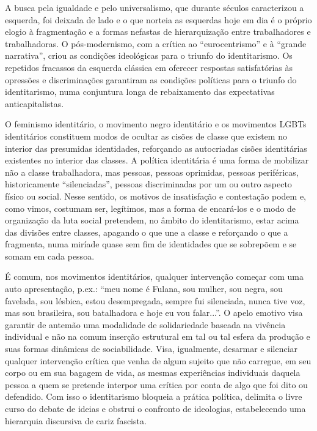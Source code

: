 A busca pela igualdade e pelo universalismo, que durante séculos
caracterizou a esquerda, foi deixada de lado e o que norteia as
esquerdas hoje em dia é o próprio elogio à fragmentação e a formas
nefastas de hierarquização entre trabalhadores e trabalhadoras. O
pós-modernismo, com a crítica ao ``eurocentrismo'' e à ``grande
narrativa'', criou as condições ideológicas para o triunfo do
identitarismo. Os repetidos fracassos da esquerda clássica em oferecer
respostas satisfatórias às opressões e discriminações garantiram as
condições políticas para o triunfo do identitarismo, numa conjuntura
longa de rebaixamento das expectativas anticapitalistas.

O feminismo identitário, o movimento negro identitário e os movimentos
LGBTs identitários constituem modos de ocultar as cisões de classe que
existem no interior das presumidas identidades, reforçando as
autocriadas cisões identitárias existentes no interior das classes. A
política identitária é uma forma de mobilizar não a classe trabalhadora,
mas pessoas, pessoas oprimidas, pessoas periféricas, historicamente
``silenciadas'', pessoas discriminadas por um ou outro aspecto físico ou
social. Nesse sentido, os motivos de insatisfação e contestação podem e,
como vimos, costumam ser, legítimos, mas a forma de encará-los e o modo
de organização da luta social pretendem, no âmbito do identitarismo,
estar acima das divisões entre classes, apagando o que une a classe e
reforçando o que a fragmenta, numa miríade quase sem fim de identidades
que se sobrepõem e se somam em cada pessoa.

É comum, nos movimentos identitários, qualquer intervenção começar com
uma auto apresentação, p.ex.: ``meu nome é Fulana, sou mulher, sou
negra, sou favelada, sou lésbica, estou desempregada, sempre fui
silenciada, nunca tive voz, mas sou brasileira, sou batalhadora e hoje
eu vou falar...''. O apelo emotivo visa garantir de antemão uma
modalidade de solidariedade baseada na vivência individual e não na
comum inserção estrutural em tal ou tal esfera da produção e suas formas
dinâmicas de sociabilidade. Visa, igualmente, desarmar e silenciar
qualquer intervenção crítica que venha de algum sujeito que não
carregue, em seu corpo ou em sua bagagem de vida, as mesmas experiências
individuais daquela pessoa a quem se pretende interpor uma crítica por
conta de algo que foi dito ou defendido. Com isso o identitarismo
bloqueia a prática política, delimita o livre curso do debate de ideias
e obstrui o confronto de ideologias, estabelecendo uma hierarquia
discursiva de cariz fascista.

